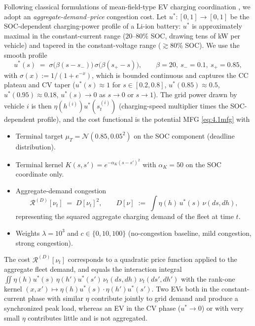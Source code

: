 \documentclass[11pt,leqno]{article}
\theoremstyle{plain}
\theoremstyle{remark}
\theoremstyle{definition}
\numberwithin{equation}{section}
\numberwithin{figure}{section}
\numberwithin{table}{section}
\numberwithin{algorithm}{section}
\begin{document}
Following classical formulations of mean-field-type EV charging coordination
\cite{cou-per-tem-deb:2012,ma-cal-his:2013,par-gen-lyg:2020},
we adopt an \emph{aggregate-demand--price} congestion cost.
Let $u^{\!*}:[0,1]\to[0,1]$ be the SOC-dependent charging-power profile of a Li-ion battery:
$u^{\!*}$ is approximately maximal in the constant-current range ($20$--$80\%$ SOC, drawing tens of kW per vehicle)
and tapered in the constant-voltage range ($\gtrsim 80\%$ SOC).
We use the smooth profile
\begin{equation}\label{eq:5ev.ustar}
 u^{\!*}(s) \;=\; \sigma\bigl(\beta(s-s_-)\bigr)\,\sigma\bigl(\beta(s_+-s)\bigr),\qquad
 \beta = 20,\ s_- = 0.1,\ s_+ = 0.85,
\end{equation}
with $\sigma(x):=1/(1+e^{-x})$, which is bounded continuous and captures the CC plateau and CV taper
($u^{\!*}(s)\approx 1$ for $s\in[0.2,0.8]$, $u^{\!*}(0.85)\approx 0.5$, $u^{\!*}(0.95)\approx 0.18$, $u^{\!*}(s)\to 0$ as $s\to 0$ or $s\to 1$).
The grid power drawn by vehicle $i$ is then $\eta(h^{(i)})u^{\!*}(s^{(i)}_t)$ (charging-speed multiplier times the SOC-dependent profile),
and the cost functional is the potential MFG \eqref{eq:4.1mfg} with
\begin{itemize}
\item Terminal target $\mu_T=\mathcal{N}(0.85, 0.05^2)$ on the SOC component (deadline distribution).
\item Terminal kernel $K(s,s')=e^{-\alpha_K(s-s')^2}$ with $\alpha_K=50$ on the SOC coordinate only.
\item Aggregate-demand congestion
\begin{equation}\label{eq:5ev.RD}
 \mathcal{R}^{(D)}[\nu_t]\;=\;D[\nu_t]^2,\qquad
 D[\nu]\;:=\;\int \eta(h)\,u^{\!*}(s)\,\nu(ds, dh),
\end{equation}
representing the squared aggregate charging demand of the fleet at time $t$.
\item Weights $\lambda=10^3$ and $c\in\{0,10,100\}$ (no-congestion baseline, mild congestion, strong congestion).
\end{itemize}
The cost $\mathcal{R}^{(D)}[\nu_t]$ corresponds to a quadratic price function applied to the aggregate fleet demand,
and equals the interaction integral $\iint \eta(h)u^{\!*}(s)\,\eta(h')u^{\!*}(s')\,\nu_t(ds,dh)\,\nu_t(ds',dh')$
with the rank-one kernel $(x,x')\mapsto \eta(h)u^{\!*}(s)\cdot\eta(h')u^{\!*}(s')$.
Two EVs both in the constant-current phase with similar $\eta$ contribute jointly to grid demand
and produce a synchronized peak load, whereas an EV in the CV phase ($u^{\!*}\to 0$)
or with very small $\eta$ contributes little and is not aggregated.
\end{document}
